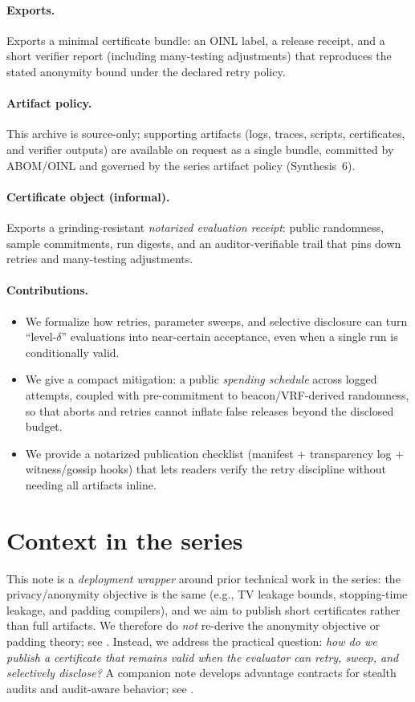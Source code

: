 \documentclass[11pt]{article}
\begin{document}
\paragraph{Exports.}
Exports a minimal certificate bundle: an OINL label, a release receipt, and a short verifier report (including many-testing adjustments) that reproduces the stated anonymity bound under the declared retry policy.

\paragraph{Artifact policy.}
This archive is source-only; supporting artifacts (logs, traces, scripts, certificates, and verifier outputs) are available on request as a single bundle, committed by ABOM/OINL and governed by the series artifact policy (Synthesis~6).\cite{series:artifactpolicy}


\paragraph{Certificate object (informal).}
Exports a grinding-resistant \emph{notarized evaluation receipt}: public randomness, sample commitments, run digests,
and an auditor-verifiable trail that pins down retries and many-testing adjustments.
\paragraph{Contributions.}
\begin{itemize}
\item We formalize how retries, parameter sweeps, and selective disclosure can turn ``level-$\delta$'' evaluations into near-certain acceptance, even when a single run is conditionally valid.
\item We give a compact mitigation: a public \emph{spending schedule} across logged attempts, coupled with pre-commitment to beacon/VRF-derived randomness, so that aborts and retries cannot inflate false releases beyond the disclosed budget.
\item We provide a notarized publication checklist (manifest + transparency log + witness/gossip hooks) that lets readers verify the retry discipline without needing all artifacts inline.
\end{itemize}

\section{Context in the series}
This note is a \emph{deployment wrapper} around prior technical work in the series:
the privacy/anonymity objective is the same (e.g., TV leakage bounds, stopping-time leakage, and padding compilers),
and we aim to publish short certificates rather than full artifacts.
We therefore do \emph{not} re-derive the anonymity objective or padding theory; see
\cite{series:schedcompiler,series:spectral,series:knapsacktransport,series:manytestinglowerbounds}.
Instead, we address the practical question:
\emph{how do we publish a certificate that remains valid when the evaluator can retry, sweep, and selectively disclose?} A companion note develops advantage contracts for stealth audits and audit-aware behavior; see \cite{series:advantagecontracts}.
\end{document}
